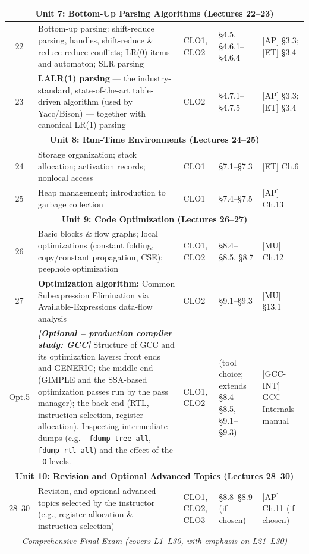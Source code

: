 \documentclass{article}
\begin{document}
\begin{longtable}{|c|p{5.1cm}|p{1.1cm}|p{2.5cm}|p{3.3cm}|}
\multicolumn{5}{|c|}{\cellcolor{gray!20}\textbf{Unit 7: Bottom-Up Parsing Algorithms (Lectures 22--23)}} \\ \hline
22 & Bottom-up parsing: shift-reduce parsing, handles, shift-reduce \& reduce-reduce conflicts; LR(0) items and automaton; SLR parsing & CLO1, CLO2 & \S4.5, \S4.6.1--\S4.6.4 & [AP] \S3.3; [ET] \S3.4 \\ \hline
23 & \textbf{LALR(1) parsing} --- the industry-standard, state-of-the-art table-driven algorithm (used by Yacc/Bison) --- together with canonical LR(1) parsing & CLO2 & \S4.7.1--\S4.7.5 & [AP] \S3.3; [ET] \S3.4 \\ \hline

\multicolumn{5}{|c|}{\cellcolor{gray!20}\textbf{Unit 8: Run-Time Environments (Lectures 24--25)}} \\ \hline
24 & Storage organization; stack allocation; activation records; nonlocal access & CLO1 & \S7.1--\S7.3 & [ET] Ch.6 \\ \hline
25 & Heap management; introduction to garbage collection & CLO1 & \S7.4--\S7.5 & [AP] Ch.13 \\ \hline

\multicolumn{5}{|c|}{\cellcolor{gray!20}\textbf{Unit 9: Code Optimization (Lectures 26--27)}} \\ \hline
26 & Basic blocks \& flow graphs; local optimizations (constant folding, copy/constant propagation, CSE); peephole optimization & CLO1, CLO2 & \S8.4--\S8.5, \S8.7 & [MU] Ch.12 \\ \hline
27 & \textbf{Optimization algorithm:} Common Subexpression Elimination via Available-Expressions data-flow analysis & CLO2 & \S9.1--\S9.3 & [MU] \S13.1 \\ \hline
\rowcolor{blue!8}
Opt.5 & \emph{\textbf{[Optional -- production compiler study: GCC]}} Structure of GCC and its optimization layers: front ends and GENERIC; the middle end (GIMPLE and the SSA-based optimization passes run by the pass manager); the back end (RTL, instruction selection, register allocation). Inspecting intermediate dumps (e.g.\ \texttt{-fdump-tree-all}, \texttt{-fdump-rtl-all}) and the effect of the \texttt{-O} levels. & CLO1, CLO2 & (tool choice; extends \S8.4--\S8.5, \S9.1--\S9.3) & [GCC-INT] GCC Internals manual \\ \hline

\multicolumn{5}{|c|}{\cellcolor{gray!20}\textbf{Unit 10: Revision and Optional Advanced Topics (Lectures 28--30)}} \\ \hline
28--30 & Revision, and optional advanced topics selected by the instructor (e.g., register allocation \& instruction selection) & CLO1, CLO2, CLO3 & \S8.8--\S8.9 (if chosen) & [AP] Ch.11 (if chosen) \\ \hline
\multicolumn{5}{|c|}{\cellcolor{yellow!25}\textit{--- Comprehensive Final Exam (covers L1--L30, with emphasis on L21--L30) ---}} \\ \hline
\end{longtable}
\end{document}

